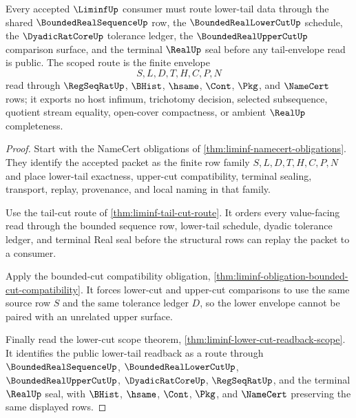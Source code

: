 \begin{theorem}
\label{thm:liminf-scoped-tail-envelope}
Every accepted $\LiminfUp$ consumer must route lower-tail data through the shared $\BoundedRealSequenceUp$ row, the $\BoundedRealLowerCutUp$ schedule, the $\DyadicRatCoreUp$ tolerance ledger, the $\BoundedRealUpperCutUp$ comparison surface, and the terminal $\RealUp$ seal before any tail-envelope read is public. The scoped route is the finite envelope
$$
S,L,D,T,H,C,P,N
$$
read through $\RegSeqRatUp$, $\BHist$, $\hsame$, $\Cont$, $\Pkg$, and $\NameCert$ rows; it exports no host infimum, trichotomy decision, selected subsequence, quotient stream equality, open-cover compactness, or ambient $\RealUp$ completeness.
\end{theorem}
\begin{proof}
Start with the NameCert obligations of \autoref{thm:liminf-namecert-obligations}. They identify the accepted packet as the finite row family $S,L,D,T,H,C,P,N$ and place lower-tail exactness, upper-cut compatibility, terminal sealing, transport, replay, provenance, and local naming in that family.

Use the tail-cut route of \autoref{thm:liminf-tail-cut-route}. It orders every value-facing read through the bounded sequence row, lower-tail schedule, dyadic tolerance ledger, and terminal Real seal before the structural rows can replay the packet to a consumer.

Apply the bounded-cut compatibility obligation, \autoref{thm:liminf-obligation-bounded-cut-compatibility}. It forces lower-cut and upper-cut comparisons to use the same source row $S$ and the same tolerance ledger $D$, so the lower envelope cannot be paired with an unrelated upper surface.

Finally read the lower-cut scope theorem, \autoref{thm:liminf-lower-cut-readback-scope}. It identifies the public lower-tail readback as a route through $\BoundedRealSequenceUp$, $\BoundedRealLowerCutUp$, $\BoundedRealUpperCutUp$, $\DyadicRatCoreUp$, $\RegSeqRatUp$, and the terminal $\RealUp$ seal, with $\BHist$, $\hsame$, $\Cont$, $\Pkg$, and $\NameCert$ preserving the same displayed rows.
\end{proof}

